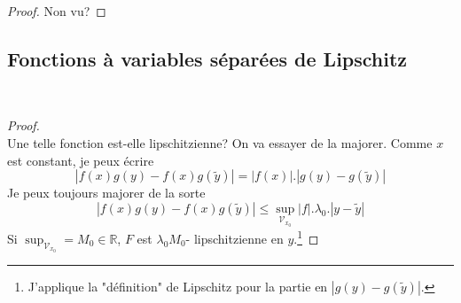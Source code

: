 	
	
	\begin{proof}
	Non vu? 
	\end{proof}
	
	\setcounter{subsection}{2}
	\subsection{Fonctions à variables séparées de Lipschitz}
	\ 	
	\begin{proof}\ \\
	Une telle fonction est-elle lipschitzienne? On va essayer de la majorer. Comme 
	$x$ est constant, je peux écrire 
	\begin{equation}
	|f(x)g(y) - f(x)g(\tilde{y})| = |f(x)|.|g(y)-g(\tilde{y})|
	\end{equation}
	Je peux toujours majorer de la sorte
	\begin{equation}
	|f(x)g(y) - f(x)g(\tilde{y})| \leq \sup_{\mathcal{V}_{x_0}} |f|.\lambda_0.
	|y-\tilde{y}|
	\end{equation}
	Si $\sup_{\mathcal{V}_{x_0}} = M_0\in\mathbb{R}$, $F$ est $\lambda_0 M_0$-
	lipschitzienne en $y$.\footnote{J'applique la "définition" de Lipschitz pour 
	la partie en $|g(y)-g(\tilde{y})|$.}
	\end{proof}
	
	
	
	\setcounter{subsection}{5}
